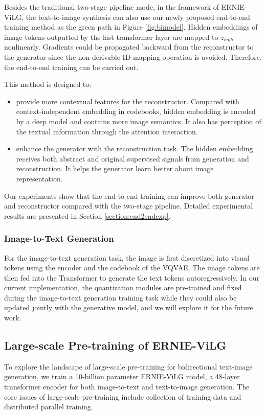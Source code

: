 \documentclass{article}
\begin{document}
Besides the traditional two-stage pipeline mode, in the framework of ERNIE-ViLG, the text-to-image synthesis can also use our newly proposed end-to-end training method as the green path in Figure \ref{fig:bimodel}. Hidden embeddings of image tokens outputted by the last transformer layer are mapped to $z_{emb}$ nonlinearly. Gradients could be propagated backward from the reconstructor to the generator since the non-derivable ID mapping operation is avoided. Therefore, the end-to-end training can be carried out.

This method is designed to:
\begin{itemize}
\item provide more contextual features for the reconstructor. Compared with context-independent embedding in codebooks, hidden embedding is encoded by a deep model and contains more image semantics. It also has perception of the textual information through the attention interaction.
\item enhance the generator with the reconstruction task. The hidden embedding receives both abstract and original supervised signals from generation and reconstruction. It helps the generator learn better about image representation.
\end{itemize}

Our experiments show that the end-to-end training can improve both generator and reconstructor compared with the two-stage pipeline. Detailed experimental results are presented in Section \ref{section:end2endexp}.

\subsubsection{Image-to-Text Generation}
For the image-to-text generation task, the image is first discretized into visual tokens using the encoder and the codebook of the VQVAE. The image tokens are then fed into the Transformer to generate the text tokens autoregressively. In our current implementation, the quantization modules are pre-trained and fixed during the image-to-text generation training task while they could also be updated jointly with the generative model, and we will explore it for the future work. 


\subsection{Large-scale Pre-training of ERNIE-ViLG}
To explore the landscape of large-scale pre-training for bidirectional text-image generation, we train a 10-billion parameter ERNIE-ViLG model, a 48-layer transformer encoder for both image-to-text and text-to-image generation. The core issues of large-scale pre-training include collection of training data and distributed parallel training.
\end{document}
